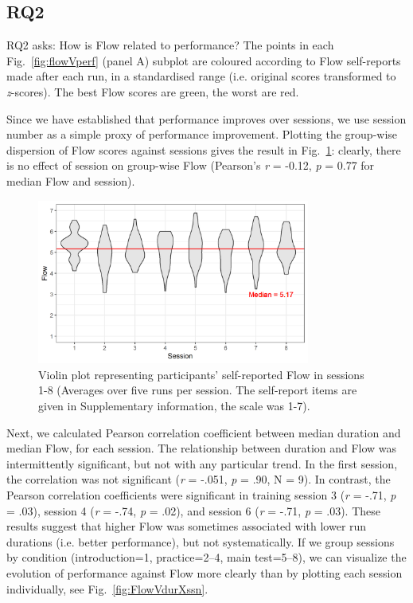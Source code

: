 \documentclass[fleqn,10pt]{wlscirep}
\newcommand{\nicewidth}{0.8\textwidth}
\begin{document}
\subsection*{RQ2}
{\sf RQ2} asks: How is Flow related to performance? The points in each Fig.~\ref{fig:flowVperf} (panel A) subplot are coloured according to Flow self-reports made after each run, in a standardised range (i.e. original scores transformed to {\it z}-scores). The best Flow scores are green, the worst are red.

Since we have established that performance improves over sessions, we use session number as a simple proxy of performance improvement. Plotting the group-wise dispersion of Flow scores against sessions gives the result in Fig.~\ref{fig:FlowVssn}: clearly, there is no effect of session on group-wise Flow (Pearson's {\it r} = -0.12, {\it p} = 0.77 for median Flow and session).

\begin{figure}[!ht]
	\centering
	\includegraphics[width=\nicewidth]{session_fss2}
	\caption{Violin plot representing participants' self-reported Flow in sessions 1-8 (Averages over five runs per session. The self-report items are given in Supplementary information, the scale was 1-7).}
	\label{fig:FlowVssn}
\end{figure}

Next, we calculated Pearson correlation coefficient between median duration and median Flow, for each session. The relationship between duration and Flow was intermittently significant, but not with any particular trend. In the first session, the correlation was not significant ({\it r} = -.051, {\it p} = .90, N = 9). In contrast, the Pearson correlation coefficients were significant in training session 3 ({\it r} = -.71, {\it p} = .03), session 4 ({\it r} = -.74, {\it p} = .02), and session 6 ({\it r} = -.71, {\it p} = .03). These results suggest that higher Flow was sometimes associated with lower run durations (i.e. better performance), but not systematically. If we group sessions by condition (introduction=1, practice=2--4, main test=5--8), we can visualize the evolution of performance against Flow more clearly than by plotting each session individually, see Fig.~\ref{fig:FlowVdurXssn}.
\end{document}
